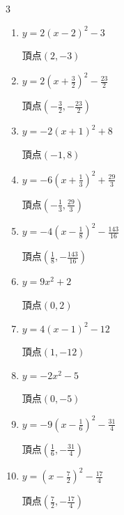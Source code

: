 \begin{multicols}{3}
\begin{enumerate}
        $\displaystyle 頂点\left( \frac{3}{4} , \frac{7}{8} \right)$

  \item $\displaystyle y=2\left( x-2\right)^{2}-3$

        $\displaystyle 頂点\left( 2 , -3 \right)$

  \item $\displaystyle y=2\left( x+\frac{3}{2}\right)^{2}-\frac{23}{2}$

        $\displaystyle 頂点\left( -\frac{3}{2} , -\frac{23}{2} \right)$

  \item $\displaystyle y=-2\left( x+1\right)^{2}+8$

        $\displaystyle 頂点\left( -1 , 8 \right)$

  \item $\displaystyle y=-6\left( x+\frac{1}{3}\right)^{2}+\frac{29}{3}$

        $\displaystyle 頂点\left( -\frac{1}{3} , \frac{29}{3} \right)$

  \item $\displaystyle y=-4\left( x-\frac{1}{8}\right)^{2}-\frac{143}{16}$

        $\displaystyle 頂点\left( \frac{1}{8} , -\frac{143}{16} \right)$

  \item $\displaystyle y=9x^{2}+2$

        $\displaystyle 頂点\left( 0 , 2 \right)$

  \item $\displaystyle y=4\left( x-1\right)^{2}-12$

        $\displaystyle 頂点\left( 1 , -12 \right)$

  \item $\displaystyle y=-2x^{2}-5$

        $\displaystyle 頂点\left( 0 , -5 \right)$

  \item $\displaystyle y=-9\left( x-\frac{1}{6}\right)^{2}-\frac{31}{4}$

        $\displaystyle 頂点\left( \frac{1}{6} , -\frac{31}{4} \right)$

\columnbreak %

\resetques

  \item $\displaystyle y=\left( x-\frac{7}{2}\right)^{2}-\frac{17}{4}$

        $\displaystyle 頂点\left( \frac{7}{2} , -\frac{17}{4} \right)$


\end{enumerate}
\end{multicols}
